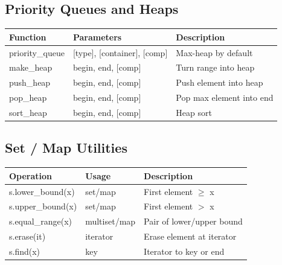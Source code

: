 \documentclass[10pt,letterpaper,landscape,twocolumn]{article}
\begin{document}
\subsection*{Priority Queues and Heaps}
\begin{tabularx}{\linewidth}{|l|l|X|}
    \hline
    \textbf{Function} & \textbf{Parameters} & \textbf{Description} \\
    \hline
    priority\_queue & [type], [container], [comp] & Max-heap by default \\
    \hline
    make\_heap & begin, end, [comp] & Turn range into heap \\
    \hline
    push\_heap & begin, end, [comp] & Push element into heap \\
    \hline
    pop\_heap & begin, end, [comp] & Pop max element into end \\
    \hline
    sort\_heap & begin, end, [comp] & Heap sort \\
    \hline
\end{tabularx}

\subsection*{Set / Map Utilities}
\begin{tabularx}{\linewidth}{|l|l|X|}
    \hline
    \textbf{Operation} & \textbf{Usage} & \textbf{Description} \\
    \hline
    s.lower\_bound(x) & set/map & First element $\geq$ x \\
    \hline
    s.upper\_bound(x) & set/map & First element $>$ x \\
    \hline
    s.equal\_range(x) & multiset/map & Pair of lower/upper bound \\
    \hline
    s.erase(it) & iterator & Erase element at iterator \\
    \hline
    s.find(x) & key & Iterator to key or end \\
    \hline
\end{tabularx}
\end{document}
